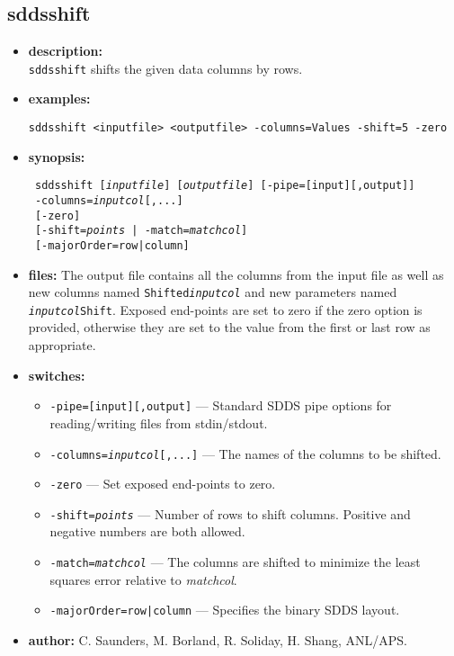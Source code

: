 \newpage 
\subsection{sddsshift} 
\label{sddsshift} 
 
\begin{itemize} 
\item {\bf description:} \hspace*{1mm}\\ 
{\tt sddsshift} shifts the given data columns by rows.
\item {\bf examples:} 
\begin{flushleft}
{\tt sddsshift <inputfile> <outputfile> -columns=Values -shift=5 -zero }
\end{flushleft} 
\item {\bf synopsis:}  
\begin{flushleft}
{\tt 
sddsshift [{\em inputfile}] [{\em outputfile}] [-pipe=[input][,output]] \\ \
-columns={\em inputcol}[,...] \\ \
[-zero] \\ \
[-shift={\em points} | -match={\em matchcol}] \\ \
[-majorOrder=row|column]}
\end{flushleft} 
\item {\bf files:} 
The output file contains all the columns from the input file as well as new columns named {\tt Shifted{\em inputcol}} and new parameters named {\tt {\em inputcol}Shift}. Exposed end-points are set to zero if the zero option is provided, otherwise they are set to the value from the first or last row as appropriate.
\item {\bf switches:} 
    \begin{itemize} 
    \item {\tt -pipe=[input][,output]} --- Standard SDDS pipe options for reading/writing files from stdin/stdout.
    \item {\tt -columns={\em inputcol}[,...]} --- The names of the columns to be shifted.
    \item {\tt -zero} --- Set exposed end-points to zero.
    \item {\tt -shift={\em points}} --- Number of rows to shift columns. Positive and negative numbers are both allowed.
    \item {\tt -match={\em matchcol}} --- The columns are shifted to minimize the least squares error relative to {\em matchcol}.
    \item {\tt -majorOrder=row|column} --- Specifies the binary SDDS layout.
\end{itemize} 

\item {\bf author:} C. Saunders, M. Borland, R. Soliday, H. Shang, ANL/APS. 
\end{itemize} 
 
